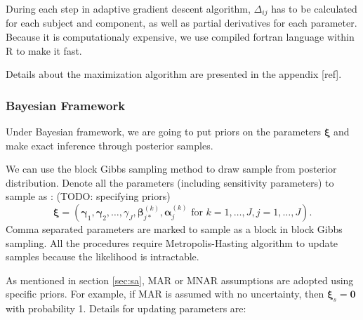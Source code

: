 \documentclass[12pt]{article}
\begin{document}
During each step in adaptive gradient descent algorithm, $\Delta_{ij}$ has
to be calculated for each subject and component, as well as partial
derivatives for each parameter. Because it is computationaly
expensive, we use compiled fortran language within R to make it fast.

Details about the maximization algorithm are presented in the appendix
[ref].

\subsubsection{Bayesian Framework}
\label{sec:bayesian}

Under Bayesian framework, we are going to put priors on the parameters
$\bm \xi$ and make exact inference through posterior samples.

We can use the block Gibbs sampling method to draw sample from
posterior distribution. Denote all the parameters (including
sensitivity parameters) to sample as : (TODO: specifying priors)
\begin{displaymath}
  \bm \xi = \left( \bm \gamma_1, \bm \gamma_2, \ldots, \gamma_J, 
\bm \beta_{j*}^{(k)}, \bm \alpha_j^{(k)}
    \text{ for } k = 1, \ldots, J, j = 1, \ldots, J \right).
\end{displaymath}
Comma separated parameters are marked to sample as a block in block
Gibbs sampling.  All the procedures require Metropolis-Hasting
algorithm to update samples because the likelihood is intractable.

As mentioned in section \ref{sec:sa}, MAR or MNAR assumptions are
adopted using specific priors. For example, if MAR is assumed with no
uncertainty, then $ \bm \xi _s= \bm 0$ with probability 1. Details for
updating parameters are:
\end{document}
